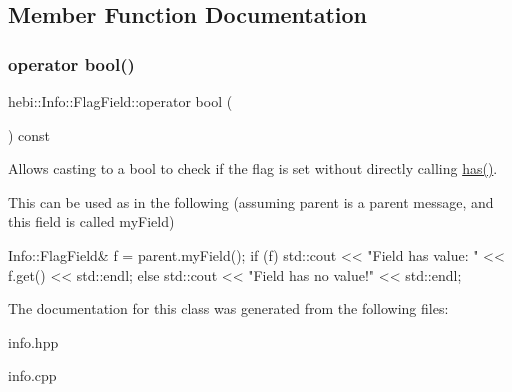\subsection{Member Function Documentation}
\mbox{\label{classhebi_1_1Info_1_1FlagField_a8bed163d96f1f05a9d1dec287d611a9c}} 
\subsubsection{\texorpdfstring{operator bool()}{operator bool()}}
{\footnotesize\ttfamily hebi\+::\+Info\+::\+Flag\+Field\+::operator bool (\begin{DoxyParamCaption}{ }\end{DoxyParamCaption}) const\hspace{0.3cm}{\ttfamily [explicit]}}



Allows casting to a bool to check if the flag is set without directly calling {\ttfamily \hyperlink{classhebi_1_1Info_1_1FlagField_a3ffec34227542df3ec2ed5d9c0b9ee5a}{has()}}. 

This can be used as in the following (assuming \textquotesingle{}parent\textquotesingle{} is a parent message, and this field is called \textquotesingle{}my\+Field\textquotesingle{}) 
\begin{DoxyCode}
Info::FlagField& f = parent.myField();
\textcolor{keywordflow}{if} (f)
  std::cout << \textcolor{stringliteral}{"Field has value: "} << f.get() << std::endl;
\textcolor{keywordflow}{else}
  std::cout << \textcolor{stringliteral}{"Field has no value!"} << std::endl;
\end{DoxyCode}
 

The documentation for this class was generated from the following files\+:\begin{DoxyCompactItemize}
\item 
info.\+hpp\item 
info.\+cpp\end{DoxyCompactItemize}
